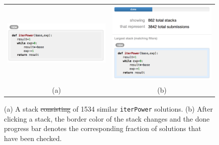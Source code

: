 \documentclass[12pt,twoside]{mitthesis}
\newcommand \codevar[1]{\texttt{#1}}
\providecommand{\DIFdeltex}[1]{{\protect\color{red}\sout{#1}}}                      %
\providecommand{\DIFdelFL}[1]{\DIFdel{#1}} %
\providecommand{\DIFdelbeginFL}{} %
\providecommand{\DIFdelendFL}{} %
\providecommand{\DIFdel}[1]{\texorpdfstring{\DIFdeltex{#1}}{}} %
\begin{document}
{{{{{{{{{{\begin{figure}[htpb]
\begin{tabular}{c | c}
\begin{minipage}{.5\linewidth}
\centering
\includegraphics[width=0.95\linewidth]{Body/figures/overcode/stackScreenShot.png}
\end{minipage}
&
\begin{minipage}{.5\linewidth}
\centering
\includegraphics[width=0.95\linewidth]{Body/figures/overcode/checkDone.png}
\end{minipage}
\\
(a) & (b)
\end{tabular}
\caption{(a) A stack \DIFdelbeginFL \DIFdelFL{consisting }\DIFdelendFL of 1534 similar \codevar{iterPower} solutions. (b) After clicking a stack, the border color of the stack changes and the done progress bar denotes the corresponding fraction of solutions that have been checked.}
\label{stacks}
\end{figure}

}}}}}}}}}}
\end{document}
